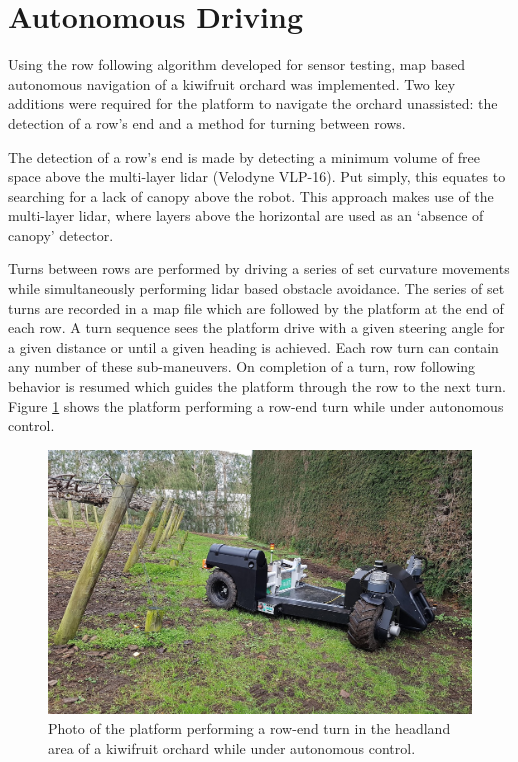 \documentclass[preprint,authoryear,12pt]{elsarticle}
\begin{document}
\section{Autonomous Driving}
\label{sect:autonomous}
    Using the row following algorithm developed for sensor testing, map based autonomous navigation of a kiwifruit orchard was implemented.
    Two key additions were required for the platform to navigate the orchard unassisted: the detection of a row's end and a method for turning between rows.

    The detection of a row's end is made by detecting a minimum volume of free space above the multi-layer lidar (Velodyne VLP-16).
    Put simply, this equates to searching for a lack of canopy above the robot.
    This approach makes use of the multi-layer lidar, where layers above the horizontal are used as an `absence of canopy' detector.

    Turns between rows are performed by driving a series of set curvature movements while simultaneously performing lidar based obstacle avoidance.
    The series of set turns are recorded in a map file which are followed by the platform at the end of each row.
    A turn sequence sees the platform drive with a given steering angle for a given distance or until a given heading is achieved.
    Each row turn can contain any number of these sub-maneuvers.
    On completion of a turn, row following behavior is resumed which guides the platform through the row to the next turn.
    Figure \ref{fig:suzy_turning} shows the platform performing a row-end turn while under autonomous control.

    \begin{figure}[htb]
        \centering
        \includegraphics[width=\linewidth]{imgs/photos/suzy_turning.jpg}
        \caption{
            Photo of the platform performing a row-end turn in the headland area of a kiwifruit orchard while under autonomous control.
        }
        \label{fig:suzy_turning}
    \end{figure}
\end{document}

